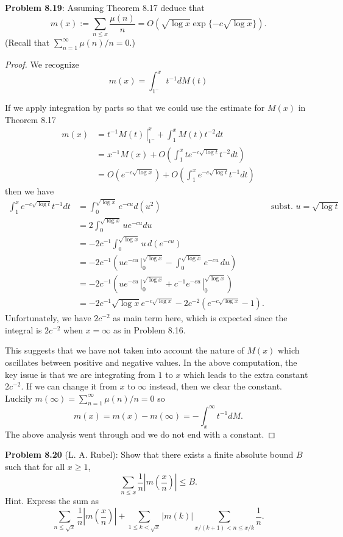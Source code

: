 \documentclass[12pt]{article}
\renewcommand{\O}[1]{O\left( #1 \right)}
\newcommand{\Abs}[1]{\left| #1 \right|}
\begin{document}
\textbf{Problem 8.19}: Assuming Theorem 8.17 deduce that
$$m(x) := \sum_{n \leq x} \frac{\mu(n)}{n} = O(\sqrt{\log x} \exp\{-c\sqrt{\log x}\}).$$
(Recall that $\sum_{n=1}^{\infty} \mu(n)/n = 0$.)

\begin{proof}
We recognize
$$m(x) = \int_{1^-}^{x} t^{-1} dM(t)$$

If we apply integration by parts so that we could use the estimate for $M(x)$ in Theorem 8.17
\begin{align*}
m(x) &= \left.t^{-1} M(t) \frac{}{} \right|_{1^-}^{x} + \int_1^x M(t) t^{-2} dt\\
&= x^{-1} M(x) + \O{\int_1^x t e^{-c\sqrt{\log t}} t^{-2} dt}\\
&= \O{e^{-c\sqrt{\log x}}} + \O{\int_1^x e^{-c\sqrt{\log t}} t^{-1} dt}
\end{align*}
then we have
\begin{align*}
\int_1^x e^{-c\sqrt{\log t}} t^{-1} dt &= \int_0^{\sqrt{\log x}} e^{-cu} d(u^2) &\text{subst. } u = \sqrt{\log t}\\
&= 2 \int_0^{\sqrt{\log x}} u e^{-cu} du\\
&= -2c^{-1} \int_0^{\sqrt{\log x}} u \, d(e^{-cu})\\
&= -2c^{-1} \left( \left. u e^{-cu} \frac{}{} \right|_0^{\sqrt{\log x}} - \int_0^{\sqrt{\log x}} e^{-cu} \, du \right)\\
&= -2c^{-1} \left( \left. u e^{-cu} \frac{}{} \right|_0^{\sqrt{\log x}} + \left. c^{-1} e^{-cu} \frac{}{} \right|_0^{\sqrt{\log x}} \right)\\
&= -2c^{-1}\sqrt{\log x} e^{-c\sqrt{\log x}} - 2c^{-2}(e^{-c\sqrt{\log x}} - 1).
\end{align*}
Unfortunately, we have $2c^{-2}$ as main term here, which is expected since the integral is $2c^{-2}$ when $x = \infty$ as in Problem 8.16.

This suggests that we have not taken into account the nature of $M(x)$ which oscillates between positive and negative values. In the above computation, the key issue is that we are integrating from $1$ to $x$ which leads to the extra constant $2c^{-2}$. If we can change it from $x$ to $\infty$ instead, then we clear the constant. Luckily $m(\infty) = \sum_{n=1}^{\infty} \mu(n)/n = 0$ so
$$m(x) = m(x) - m(\infty) = - \int_x^\infty t^{-1} dM.$$
The above analysis went through and we do not end with a constant.
\end{proof}

\textbf{Problem 8.20} (L. A. Rubel): Show that there exists a finite absolute bound $B$ such that for all $x \geq 1$,
$$\sum_{n \leq x}\frac{1}{n} \Abs{m(\frac{x}{n})} \leq B.$$
Hint. Express the sum as
$$\sum_{n \leq \sqrt{x}} \frac{1}{n} \Abs{m(\frac{x}{n})} + \sum_{1 \leq k < \sqrt{x}} |m(k)| \sum_{x/(k+1) < n \leq x/k} \frac{1}{n}.$$
\end{document}
